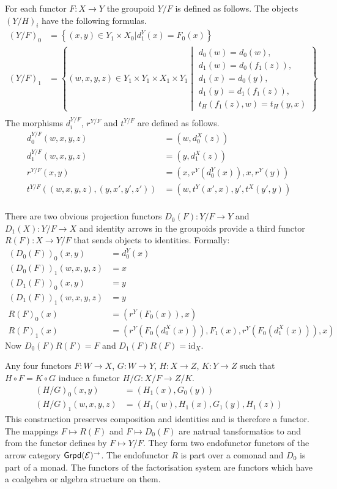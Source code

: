 \documentclass{amsart}
\theoremstyle{plain}
\theoremstyle{definition}
\newcommand\cat\mathcal
\newcommand\set[1]{\left\{#1\right\}}
\newcommand\id{\mathrm{id}}
\begin{document}
For each functor $F:X\to Y$ the groupoid $Y/F$ is defined as follows. The objects $(Y/H)_i$ have the following formulas.
\begin{align*}
(Y/F)_0 &= \set{(x,y)\in Y_1\times X_0| d_1^Y(x)=F_0(x) }\\
(Y/F)_1 &= \set{(w,x,y,z)\in Y_1\times Y_1\times X_1 \times Y_1 \middle| \begin{array}{c} d_0(w) = d_0(w),\\ d_1(w)=d_0(f_1(z)),\\ d_1(x)=d_0(y),\\ d_1(y)=d_1(f_1(z)),\\ t_H(f_1(z),w) = t_H(y,x) \end{array}}\\
\end{align*}
The morphisms $d_i^{Y/F}$, $r^{Y/F}$ and $t^{Y/F}$ are defined as follows.
\begin{align*}
d_0^{Y/F}(w,x,y,z) &= (w,d^X_0(z))\\
d_1^{Y/F}(w,x,y,z) &= (y,d^X_1(z))\\
r^{Y/F}(x,y) &= (x,r^Y(d_0^Y(x)),x,r^Y(y))\\
t^{Y/F}((w,x,y,z),(y,x',y',z')) &= (w,t^Y(x',x),y',t^X(y',y))\\
\end{align*}

There are two obvious projection functors $D_0(F): Y/F \to Y$ and $D_1(X):Y/F\to X$ and identity arrows in the groupoids provide a third functor $R(F):X\to Y/F$ that sends objects to identities. Formally:
\begin{align*}
(D_0(F))_0(x,y) &= d^Y_0(x) \\
(D_0(F))_1(w,x,y,z) &= x \\
(D_1(F))_0(x,y) &= y \\
(D_1(F))_1(w,x,y,z) &= y \\
R(F)_0(x) &= (r^Y(F_0(x)),x) \\
R(F)_1(x) &= (r^Y(F_0(d_0^X(x))),F_1(x),r^Y(F_0(d_1^X(x))), x)
\end{align*}
Now $D_0(F)R(F) = F$ and $D_1(F)R(F) = \id_{X}$.

Any four functors $F:W\to X$, $G:W\to Y$, $H:X\to Z$, $K:Y\to Z$ such that $H\circ F = K\circ G$ induce a functor $H/G:X/F \to Z/K$.
\begin{align*} (H/G)_0(x,y) &= (H_1(x),G_0(y))\\ (H/G)_1(w,x,y,z) &= (H_1(w),H_1(x),G_1(y),H_1(z)) \end{align*}
This construction preserves composition and identities and is therefore a functor. The mappings $F\mapsto R(F)$ and $F\mapsto D_0(F)$ are natrual tansformatios to and from the functor defines by $F \mapsto Y/F$. They form two endofunctor functors of the arrow category $\grpd(\cat E)^\to$. The endofunctor $R$ is part over a comonad and $D_0$ is part of a monad. The functors of the factorisation system are functors which have a coalgebra or algebra structure on them.
\end{document}

